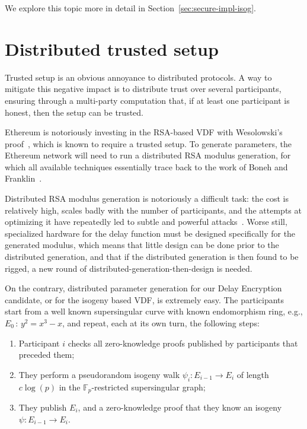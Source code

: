 \documentclass{llncs}
\newcommand{\F}{\mathbb{F}}
\begin{document}
We explore this topic more in detail in
Section~\ref{sec:secure-impl-isog}.


\section{Distributed trusted setup}
\label{sec:distr-trust-setup}

Trusted setup is an obvious annoyance to distributed protocols. %
A way to mitigate this negative impact is to distribute trust over
several participants, ensuring through a multi-party computation that,
if at least one participant is honest, then the setup can be trusted.

Ethereum is notoriously investing in the RSA-based VDF with
Wesolowski's proof~\cite{ethereum-vdf,Wesolowski}, which is known to
require a trusted setup. %
To generate parameters, the Ethereum network will need to run a
distributed RSA modulus generation, for which all available techniques
essentially trace back to the work of Boneh and
Franklin~\cite{10.1007/BFb0052253}.

Distributed RSA modulus generation is notoriously a difficult task:
the cost is relatively high, scales badly with the number of
participants, and the attempts at optimizing it have repeatedly led to
subtle and powerful attacks~\cite{eth-octopus,eth-dogbyte}. %
Worse still, specialized hardware for the delay function must be
designed specifically for the generated modulus, which means that
little design can be done prior to the distributed generation, and
that if the distributed generation is then found to be rigged, a new
round of distributed-generation-then-design is needed.

On the contrary, distributed parameter generation for our Delay
Encryption candidate, or for the isogeny based VDF, is extremely
easy. %
The participants start from a well known supersingular curve with
known endomorphism ring, e.g., $E_0\,:\,y^2=x^3-x$, and repeat, each
at its own turn, the following steps:
\begin{enumerate}
\item Participant $i$ checks all zero-knowledge proofs published by
  participants that preceded them;
\item They perform a pseudorandom isogeny walk $\psi_i:E_{i-1}\to E_i$
  of length $c\log(p)$ in the $\F_p$-restricted supersingular graph;
\item They publish $E_i$, and a zero-knowledge proof that they know an
  isogeny $\psi:E_{i-1}\to E_i$.
\end{enumerate}
\end{document}
